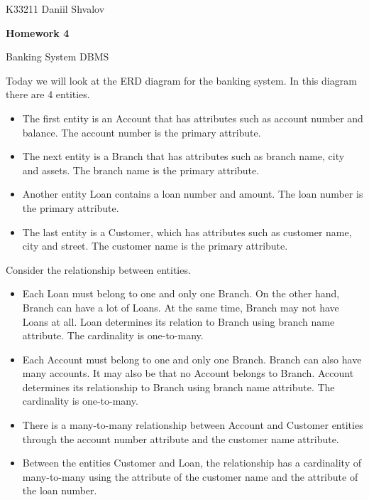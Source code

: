\documentclass[a4paper, 14pt]{extarticle}
\begin{document}
\begin{flushright}
  K33211 Daniil Shvalov
\end{flushright}

\begin{center}
  \textbf{Homework 4}

  Banking System DBMS
\end{center}

Today we will look at the ERD diagram for the banking system. In this diagram
there are 4 entities.
\begin{itemize}
  \item The first entity is an Account that has attributes such as account number and
  balance. The account number is the primary attribute.
  \item The next entity is a Branch that has attributes such as branch name,
  city and assets. The branch name is the primary attribute.
  \item Another entity Loan contains a loan number and amount. The loan number
  is the primary attribute.
  \item The last entity is a Customer, which has attributes such as customer
  name, city and street. The customer name is the primary attribute.
\end{itemize}

Consider the relationship between entities.
\begin{itemize}
  \item Each Loan must belong to one and only one Branch. On the other hand,
  Branch can have a lot of Loans. At the same time, Branch may not have Loans at
  all. Loan determines its relation to Branch using branch name attribute. The
  cardinality is one-to-many.
  \item Each Account must belong to one and only one Branch. Branch can also
  have many accounts. It may also be that no Account belongs to Branch. Account
  determines its relationship to Branch using branch name attribute. The
  cardinality is one-to-many.
  \item There is a many-to-many relationship between Account and Customer
  entities through the account number attribute and the customer name attribute.
  \item Between the entities Customer and Loan, the relationship has a
  cardinality of many-to-many using the attribute of the customer name and the
  attribute of the loan number.
\end{itemize}
\end{document}
